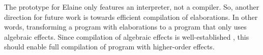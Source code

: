 The prototype for Elaine only features an interpreter, not a compiler. So, another direction for future work is towards efficient compilation of elaborations. In other words, transforming a program with elaborations to a program that only uses algebraic effects. Since compilation of algebraic effects is well-established \autocite{leijen_type_2017}, this should enable full compilation of program with higher-order effects.
